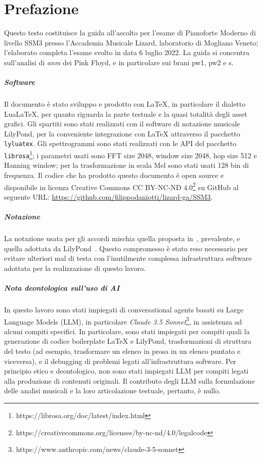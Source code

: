 \documentclass[class=book, crop=false, oneside, 12pt]{standalone}
\begin{document}
\chapter*{Prefazione}

Questo testo costituisce la guida all'ascolto per l'esame di Pianoforte Moderno di livello SSM3 presso l'Accademia Musicale Lizard, laboratorio di Mogliano Veneto; l'elaborato completa l'esame svolto in data 6 luglio 2022. La guida si concentra sull'analisi di \emph{\acrlong{anm}} dei Pink Floyd, e in particolare sui brani \acrlong{pw1}, \acrlong{pw2} e \acrlong{s}.

\paragraph{Software}
Il documento è stato sviluppo e prodotto con LaTeX, in particolare il dialetto LuaLaTeX, per quanto riguarda la parte testuale e la quasi totalità degli asset grafici. Gli spartiti sono stati realizzati con il software di notazione musicale LilyPond, per la conveniente integrazione con LaTeX attraverso il pacchetto \texttt{lyluatex}. Gli spettrogrammi sono stati realizzati con le API del pacchetto \texttt{librosa}\footnote{https://librosa.org/doc/latest/index.html}; i parametri usati sono FFT size 2048, window size 2048, hop size 512 e Hanning window; per la trasformazione in scala Mel sono stati usati 128 bin di frequenza. Il codice che ha prodotto questo documento è open source e disponibile in licenza Creative Commons CC BY-NC-ND 4.0\footnote{https://creativecommons.org/licenses/by-nc-nd/4.0/legalcode} su GitHub al seguente URL: \url{https://github.com/filippodaniotti/lizard-ga/SSM3}.

\paragraph{Notazione}
La notazione usata per gli accordi mischia quella proposta in~\cite{brachi2008armonia}, prevalente, e quella adottata da LilyPond~\cite{res:lily-chord-chart}. Questo compromesso è stato reso necessario per evitare ulteriori mal di testa con l'inutilmente complessa infrastruttura software adottata per la realizzazione di questo lavoro.

\paragraph{Nota deontologica sull'uso di AI}
In questo lavoro sono stati impiegati di conversational agents basati su Large Language Models (LLM), in particolare \emph{Claude 3.5 Sonnet}\footnote{https://www.anthropic.com/news/claude-3-5-sonnet}, in assistenza ad alcuni compiti specifici. In particolare, sono stati impiegati per compiti quali la generazione di codice boilerplate LaTeX e LilyPond, trasformazioni di struttura del testo (ad esempio, trasformare un elenco in prosa in un elenco puntato e viceversa), e il debugging di problemi legati all'infrastruttura software. Per principio etico e deontologico, non sono stati impiegati LLM per compiti legati alla produzione di contenuti originali. Il contributo degli LLM sulla formulazione delle analisi musicali e la loro articolazione testuale, pertanto, è nullo.
\end{document}
